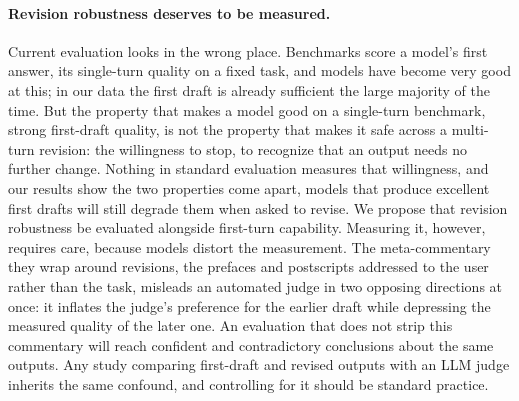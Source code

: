 \paragraph{Revision robustness deserves to be measured.} Current evaluation looks in the wrong place. Benchmarks score a model's first answer, its single-turn quality on a fixed task, and models have become very good at this; in our data the first draft is already sufficient the large majority of the time. But the property that makes a model good on a single-turn benchmark, strong first-draft quality, is not the property that makes it safe across a multi-turn revision: the willingness to stop, to recognize that an output needs no further change. Nothing in standard evaluation measures that willingness, and our results show the two properties come apart, models that produce excellent first drafts will still degrade them when asked to revise. We propose that revision robustness be evaluated alongside first-turn capability. Measuring it, however, requires care, because models distort the measurement. The meta-commentary they wrap around revisions, the prefaces and postscripts addressed to the user rather than the task, misleads an automated judge in two opposing directions at once: it inflates the judge's preference for the earlier draft while depressing the measured quality of the later one. An evaluation that does not strip this commentary will reach confident and contradictory conclusions about the same outputs. Any study comparing first-draft and revised outputs with an LLM judge inherits the same confound, and controlling for it should be standard practice.
